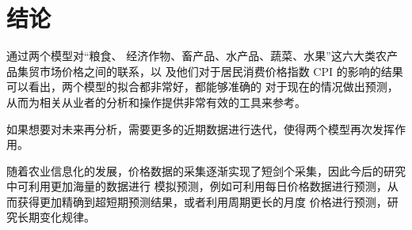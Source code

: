 \documentclass[a4paper,AutoFakeBold,AutoFakeSlant]{ctexart}
\begin{document}
\section{结论}
通过两个模型对“粮食、
经济作物、畜产品、水产品、蔬菜、水果”这六大类农产品集贸市场价格之间的联系，以
及他们对于居民消费价格指数 CPI 的影响的结果可以看出，两个模型的拟合都非常好，都能够准确的
对于现在的情况做出预测，从而为相关从业者的分析和操作提供非常有效的工具来参考。

如果想要对未来再分析，需要更多的近期数据进行迭代，使得两个模型再次发挥作用。

随着农业信息化的发展，价格数据的采集逐渐实现了短剑个采集，因此今后的研究中可利用更加海量的数据进行
模拟预测，例如可利用每日价格数据进行预测，从而获得更加精确到超短期预测结果，或者利用周期更长的月度
价格进行预测，研究长期变化规律。\cite{屠星月2014基于时间序列与}
\end{document}

